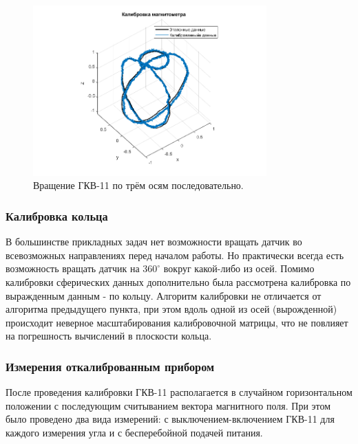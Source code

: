 \documentclass[a4paper,12pt]{article}
\begin{document}
\begin{figure}[htb] %
\centering
\includegraphics[width=0.8\textwidth]{PICS/one_of_experiments.png} %
\caption{\label{fig:one_of_experiments} Вращение ГКВ-11 по трём осям последовательно.} %
\end{figure}

\subsubsection{Калибровка кольца}
В большинстве прикладных задач нет возможности вращать датчик во всевозможных направлениях перед началом работы. Но практически всегда есть возможность вращать датчик на $360^\circ$ вокруг какой-либо из осей. Помимо калибровки сферических данных дополнительно была рассмотрена калибровка по выражденным данным - по кольцу. Алгоритм калибровки не отличается от алгоритма предыдущего пункта, при этом вдоль одной из осей (вырожденной) происходит неверное масштабирования калибровочной матрицы, что не повлияет на погрешность вычислений в плоскости кольца.

\subsubsection{Измерения откалиброванным прибором}
После проведения калибровки ГКВ-11 располагается в случайном горизонтальном положении с последующим  считыванием вектора магнитного поля. При этом было проведено два вида измерений: с выключением-включением ГКВ-11 для каждого измерения угла и с бесперебойной подачей питания.
\end{document}
